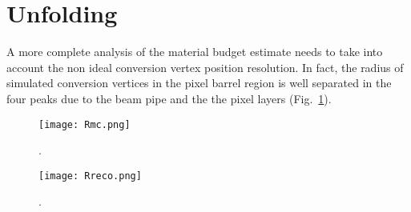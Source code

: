 \section{Unfolding}
\label{unfolding}

A more complete analysis of the material budget estimate needs to take into account the non ideal conversion vertex position resolution.
In fact, the radius of simulated conversion vertices in the pixel barrel region is well separated in the four peaks due to the beam pipe
and the the pixel layers (Fig.~\ref{Rmc}).


\begin{figure}[|htbp]
 \begin{center}
   \texttt{[image: Rmc.png]}
 \end{center}
 \caption{.}
\label{Rmc}
\end{figure}

\begin{figure}[|htbp]
 \begin{center}
   \texttt{[image: Rreco.png]}
 \end{center}
 \caption{.}
\label{Rreco}
\end{figure}
